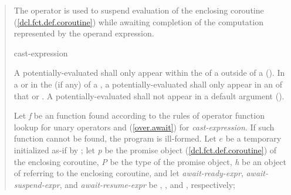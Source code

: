 \begin{quote}
\pnum
The  operator is used to suspend evaluation of the enclosing coroutine (\ref{dcl.fct.def.coroutine}) while awaiting completion of the computation represented by the operand expression.

\begin{bnf}
  \br
   cast-expression
\end{bnf}

\pnum
A potentially-evaluated 
 shall only appear within the  of a  outside of a  ().
%
In a  or in the  (if any) of a , a potentially-evaluated  shall only appear in an  of that  or .
%
%
A potentially-evaluated  shall not appear in a default argument ().

\pnum
Let \textit{f} be an  function found according to the rules of operator function lookup for unary operators and (\ref{over.await}) for \textit{cast-expression}. If such function cannot be found, the program is ill-formed. 
Let $e$ be a temporary initialized as-if by ; let \textit{p} be the promise object (\ref{dcl.fct.def.coroutine})
of the enclosing coroutine, \textit{P} be the type of the promise object, \textit{h} be an object of  referring to the enclosing coroutine, and let \textit{await-ready-expr}, \textit{await-suspend-expr}, and \textit{await-resume-expr} be
, , and , respectively;

%
%


\end{quote}

